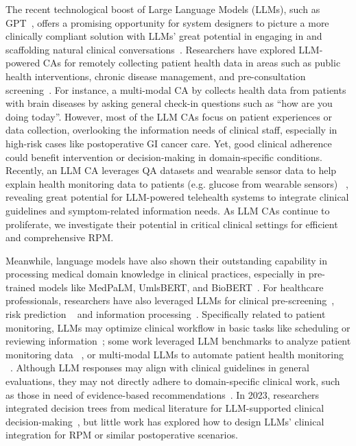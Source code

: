 The recent technological boost of Large Language Models (LLMs), such as GPT~\cite{OpenAI_2022}, offers a promising opportunity for system designers to picture a more clinically compliant solution with LLMs' great potential in engaging in and scaffolding natural clinical conversations~\cite{yunxiang2023chatdoctor,xiao2020tell, xiao2023supporting,shen2023convxai, hamalainen_evaluating_2023}. 
Researchers have explored LLM-powered CAs for remotely collecting patient health data in areas such as public health interventions, chronic disease management, and pre-consultation screening~\cite{wei_leveraging_2023, montagna2023data, dwyer2023use, ni2017mandy, li2024beyond, hao2024advancing}. For instance, a multi-modal CA by \citet{chira2022affective} collects health data from patients with brain diseases by asking general check-in questions such as ``how are you doing today''. 
However, most of the LLM CAs focus on patient experiences or data collection, overlooking the information needs of clinical staff, especially in high-risk cases like postoperative GI cancer care. Yet, good clinical adherence could benefit intervention or decision-making in domain-specific conditions. 
Recently, an LLM CA leverages QA datasets and wearable sensor data to help explain health monitoring data to patients (e.g. glucose from wearable sensors) ~\cite{ferrara2024large}, revealing great potential for LLM-powered telehealth systems to integrate clinical guidelines and symptom-related information needs. As LLM CAs continue to proliferate, we investigate their potential in critical clinical settings for efficient and comprehensive RPM.



\label{sub:related_work-3}
Meanwhile, language models have also shown their outstanding capability in processing medical domain knowledge in clinical practices, especially in pre-trained models like MedPaLM\cite{singhalLargeLanguageModels2023}, UmlsBERT\cite{michalopoulosUmlsBERTClinicalDomain2021}, and BioBERT~\cite{leeBioBERTPretrainedBiomedical2019}. For healthcare professionals, researchers have also leveraged LLMs for clinical pre-screening~\cite{hamer_improving_2023, wang_brilliant_2021}, risk prediction ~\cite{o2015risk,gatt2022review, kennedy2014delirium, beede2020human} and information processing~\cite{kocaballi_envisioning_2020, nair_generating_2023,  cascella2023evaluating, nori2023capabilities, agrawal_large_2022, arbatti_what_2023}. 
Specifically related to patient monitoring, LLMs may optimize clinical workflow in basic tasks like scheduling or reviewing information~\cite{tripathi2024efficient}; some work leveraged LLM benchmarks to analyze patient monitoring data ~\cite{healey2024llm}, or multi-modal LLMs to automate patient health monitoring ~\cite{ho2024remoni}.
Although LLM responses may align with clinical guidelines in general evaluations, they may not directly adhere to domain-specific clinical work, such as those in need of evidence-based recommendations~\cite{nwachukwu2024currently}.
In 2023, researchers integrated decision trees from medical literature for LLM-supported clinical decision-making~\cite{li2023meddm}, but little work has explored how to design LLMs' clinical integration for RPM or similar postoperative scenarios.


